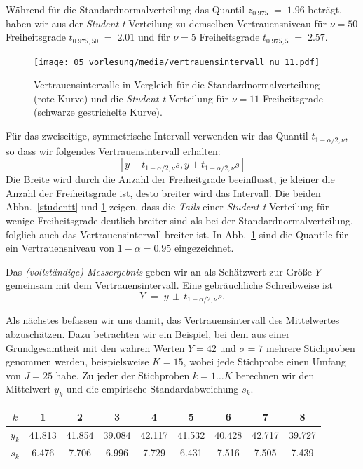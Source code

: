 Während für die Standardnormalverteilung das Quantil $z_{0.975} \; = \; 1.96$ beträgt, haben
wir aus der \textsl{Student-t}-Verteilung zu demselben Vertrauensniveau für $\nu = 50$ Freiheitsgrade
$t_{0.975, 50} \; = \; 2.01$ und für $\nu = 5$ Freiheitsgrade $t_{0.975, 5} \; = \; 2.57$.

\begin{figure}
\begin{center}
\texttt{[image: 05\_vorlesung/media/vertrauensintervall\_nu\_11.pdf]}
\caption{\label{Vertrauensintervalle} Vertrauensintervalle in Vergleich für die
Standardnormalverteilung (rote Kurve)
und die \textsl{Student-t}-Verteilung für $\nu = 11$ Freiheitsgrade (schwarze gestrichelte Kurve).}
\end{center}
\end{figure}
Für das zweiseitige, symmetrische Intervall verwenden wir das Quantil $t_{1-\alpha/2,\nu}$, so dass
wir folgendes Vertrauensintervall erhalten:
$$
[y - t_{1-\alpha/2,\nu} s, y + t_{1-\alpha/2,\nu} s]
$$
Die Breite wird durch die Anzahl der Freiheitgrade beeinflusst, je kleiner
die Anzahl der Freiheitsgrade ist, desto breiter wird das Intervall. Die beiden Abbn.~\ref{studentt}
und \ref{Vertrauensintervalle}
zeigen, dass die \textsl{Tails} einer \textsl{Student-t}-Verteilung für wenige Freiheitsgrade
deutlich breiter sind als bei der Standardnormalverteilung, folglich auch das
Vertrauensintervall breiter ist. In Abb.~\ref{Vertrauensintervalle} sind die Quantile für
ein Vertrauensniveau von $1 - \alpha = 0.95$ eingezeichnet.

Das \textsl{(vollständige) Messergebnis} geben wir an als
Schätzwert zur Größe $Y$ gemeinsam mit dem Vertrauensintervall.
Eine gebräuchliche Schreibweise ist
\begin{equation}
Y \; = \; y \, \pm \, t_{1-\alpha/2,\nu} s .
\label{vollstaendigesErgebKlassisch}
\end{equation}

Als nächstes befassen wir uns damit, das Vertrauensintervall des Mittelwertes abzuschätzen.
Dazu betrachten wir ein Beispiel, bei dem aus einer Grundgesamtheit mit den wahren
Werten $Y = 42$ und $\sigma = 7$ mehrere Stichproben genommen werden, beispielsweise $K = 15$,
wobei jede Stichprobe einen Umfang von $J = 25$ habe. Zu jeder der Stichproben $k = 1\dots K$
berechnen wir den Mittelwert $y_k$ und die empirische Standardabweichung $s_k$.

\begin{tabular}{c||c|c|c|c|c|c|c|c}
$k$   &  1     &    2   &    3   &   4    &    5   &   6    &   7    &   8   \\
\hline\hline
$y_k$ & 41.813 & 41.854 & 39.084 & 42.117 & 41.532 & 40.428 & 42.717 & 39.727\\
\hline
$s_k$ &  6.476 &  7.706 &  6.996 &  7.729 &  6.431 &  7.516 &  7.505 &  7.439\\
\end{tabular}


